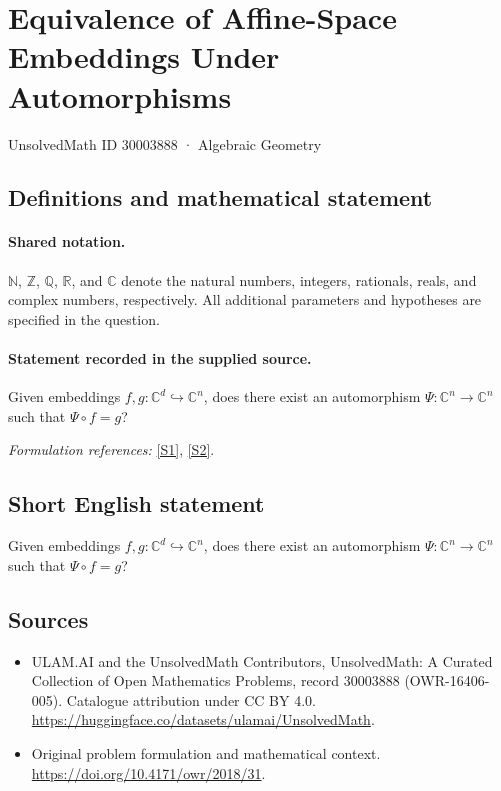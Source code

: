 \documentclass[11pt]{article}
\newcommand{\sref}[2]{\hyperlink{source:#1:#2}{[S#2]}}
\begin{document}
\setcounter{section}{30003887}
\section{Equivalence of Affine-Space Embeddings Under Automorphisms}\label{30003888}
{\small UnsolvedMath ID 30003888 · Algebraic Geometry}
\subsection{Definitions and mathematical statement}

\paragraph{Shared notation.}$\mathbb N$, $\mathbb Z$, $\mathbb Q$, $\mathbb R$, and $\mathbb C$ denote the natural numbers, integers, rationals, reals, and complex numbers, respectively. All additional parameters and hypotheses are specified in the question.


\paragraph{Statement recorded in the supplied source.}
Given embeddings $f,g:\mathbb C^d\hookrightarrow\mathbb C^n$, does there exist an automorphism $\Psi:\mathbb C^n\to\mathbb C^n$ such that $\Psi\circ f=g$?
\par\smallskip\textit{Formulation references:} \sref{30003888}{1}, \sref{30003888}{2}.
\subsection{Short English statement}
Given embeddings $f,g:\mathbb C^d\hookrightarrow\mathbb C^n$, does there exist an automorphism $\Psi:\mathbb C^n\to\mathbb C^n$ such that $\Psi\circ f=g$?
\subsection{Sources}
\begin{itemize}
\item[\hypertarget{source:30003888:1}{S1}] ULAM.AI and the UnsolvedMath Contributors, UnsolvedMath: A Curated Collection of Open Mathematics Problems, record 30003888 (OWR-16406-005). Catalogue attribution under CC BY 4.0.
\url{https://huggingface.co/datasets/ulamai/UnsolvedMath}.
\item[\hypertarget{source:30003888:2}{S2}] Original problem formulation and mathematical context.
\url{https://doi.org/10.4171/owr/2018/31}.
\end{itemize}
\label{end:30003888}
\end{document}
